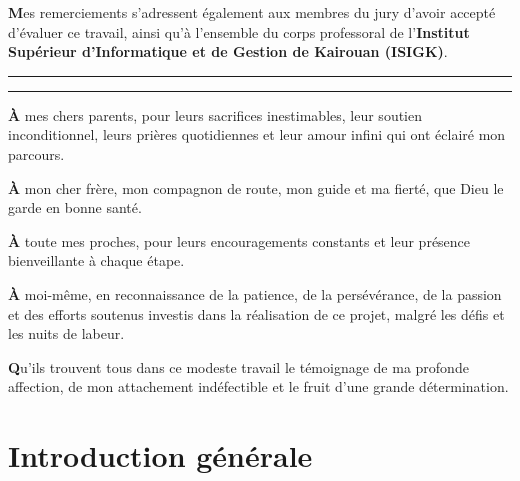 \documentclass[12pt,fleqn,a4paper]{report}
\begin{document}
\begin{justify}
\noindent \textbf{M}es remerciements s'adressent également aux membres du jury d'avoir accepté d'évaluer ce travail, ainsi qu'à l'ensemble du corps professoral de l'\textbf{Institut Supérieur d'Informatique et de Gestion de Kairouan (ISIGK)}.
\newpage
\thispagestyle{empty}

\vspace*{1.5cm}

\begin{center}
  \rule[0.5ex]{3.2cm}{0.5pt}  \quad \rule[0.5ex]{3.2cm}{0.5pt}
\end{center}

\vspace{1.2cm}

\begin{center}
  \noindent \textbf{À} mes chers parents, pour leurs sacrifices inestimables, leur soutien inconditionnel, leurs prières quotidiennes et leur amour infini qui ont éclairé mon parcours.

  \vspace{0.7cm}

  \noindent \textbf{À} mon cher frère, mon compagnon de route, mon guide et ma fierté, que Dieu le garde en bonne santé.

  \vspace{0.7cm}

  \noindent \textbf{À} toute mes proches, pour leurs encouragements constants et leur présence bienveillante à chaque étape.

  \vspace{0.7cm}

  \noindent \textbf{À} moi-même, en reconnaissance de la patience, de la persévérance, de la passion et des efforts soutenus investis dans la réalisation de ce projet, malgré les défis et les nuits de labeur.

  \vspace{1.1cm}

  \noindent \textbf{Q}u'ils trouvent tous dans ce modeste travail le témoignage de ma profonde affection, de mon attachement indéfectible et le fruit d'une grande détermination.
\end{center}

\newpage
\newpage

\chapter*{\hfill Introduction générale \hfill}


\end{justify}
\end{document}
